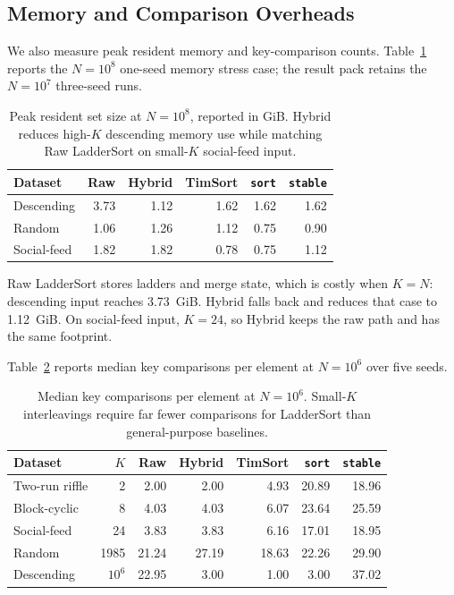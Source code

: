 \documentclass[10pt]{article}
\begin{document}
\subsection{Memory and Comparison Overheads}
\label{memory-and-comparison-overheads}

We also measure peak resident memory and key-comparison counts. Table~\ref{tab:phase5-memory} reports the \(N=10^8\) one-seed memory stress case; the result pack retains the \(N=10^7\) three-seed runs.

\begin{table}[H]
\centering
\scriptsize
\caption{Peak resident set size at \(N=10^8\), reported in GiB. Hybrid reduces high-\(K\) descending memory use while matching Raw LadderSort on small-\(K\) social-feed input.}
\label{tab:phase5-memory}
\begin{tabular}{@{}lrrrrr@{}}
\toprule
Dataset & Raw & Hybrid & TimSort & \texttt{sort} & \texttt{stable} \\
\midrule
Descending & 3.73 & 1.12 & 1.62 & 1.62 & 1.62 \\
Random & 1.06 & 1.26 & 1.12 & 0.75 & 0.90 \\
Social-feed & 1.82 & 1.82 & 0.78 & 0.75 & 1.12 \\
\bottomrule
\end{tabular}
\end{table}

Raw LadderSort stores ladders and merge state, which is costly when \(K=N\): descending input reaches 3.73~GiB. Hybrid falls back and reduces that case to 1.12~GiB. On social-feed input, \(K=24\), so Hybrid keeps the raw path and has the same footprint.

Table~\ref{tab:phase5-comparisons} reports median key comparisons per element at \(N=10^6\) over five seeds.

\begin{table}[H]
\centering
\scriptsize
\caption{Median key comparisons per element at \(N=10^6\). Small-\(K\) interleavings require far fewer comparisons for LadderSort than general-purpose baselines.}
\label{tab:phase5-comparisons}
\begin{tabular}{@{}lrrrrrr@{}}
\toprule
Dataset & \(K\) & Raw & Hybrid & TimSort & \texttt{sort} & \texttt{stable} \\
\midrule
Two-run riffle & 2 & 2.00 & 2.00 & 4.93 & 20.89 & 18.96 \\
Block-cyclic & 8 & 4.03 & 4.03 & 6.07 & 23.64 & 25.59 \\
Social-feed & 24 & 3.83 & 3.83 & 6.16 & 17.01 & 18.95 \\
Random & 1985 & 21.24 & 27.19 & 18.63 & 22.26 & 29.90 \\
Descending & \(10^6\) & 22.95 & 3.00 & 1.00 & 3.00 & 37.02 \\
\bottomrule
\end{tabular}
\end{table}
\end{document}
